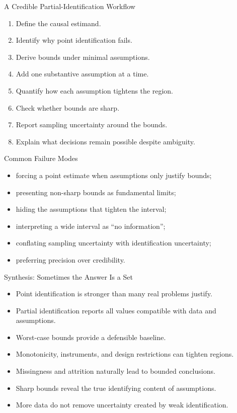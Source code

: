 \documentclass[aspectratio=169,11pt]{beamer}
\begin{document}
\begin{frame}{A Credible Partial-Identification Workflow}
\begin{enumerate}
\item Define the causal estimand.
\item Identify why point identification fails.
\item Derive bounds under minimal assumptions.
\item Add one substantive assumption at a time.
\item Quantify how each assumption tightens the region.
\item Check whether bounds are sharp.
\item Report sampling uncertainty around the bounds.
\item Explain what decisions remain possible despite ambiguity.
\end{enumerate}
\end{frame}

\begin{frame}{Common Failure Modes}
\begin{itemize}
\item forcing a point estimate when assumptions only justify bounds;
\item presenting non-sharp bounds as fundamental limits;
\item hiding the assumptions that tighten the interval;
\item interpreting a wide interval as “no information”;
\item conflating sampling uncertainty with identification uncertainty;
\item preferring precision over credibility.
\end{itemize}
\end{frame}

\begin{frame}{Synthesis: Sometimes the Answer Is a Set}
\begin{itemize}
\item Point identification is stronger than many real problems justify.
\item Partial identification reports all values compatible with data and assumptions.
\item Worst-case bounds provide a defensible baseline.
\item Monotonicity, instruments, and design restrictions can tighten regions.
\item Missingness and attrition naturally lead to bounded conclusions.
\item Sharp bounds reveal the true identifying content of assumptions.
\item More data do not remove uncertainty created by weak identification.
\end{itemize}
\end{frame}
\end{document}
